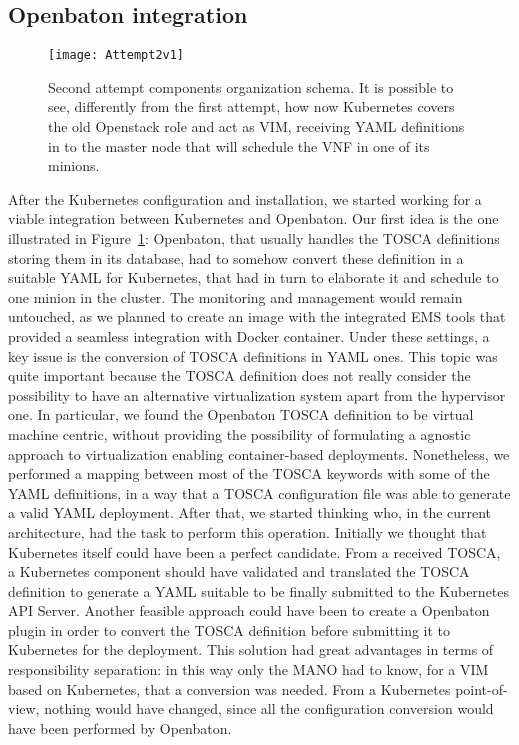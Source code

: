 \subsection{Openbaton integration}

\begin{figure}[t]
  \centering
  \texttt{[image: Attempt2v1]}
  \caption[Second attempt components organization schema]{Second attempt
    components organization schema. It is possible to see, differently from the
    first attempt, how now Kubernetes covers the old Openstack role and act as
    VIM, receiving YAML definitions in to the master node that will schedule the
    VNF in one of its minions.}
  \label{chap:archimpl:sec:secondattempt:img:schema1}
\end{figure}

After the Kubernetes configuration and installation, we started working for a
viable integration between Kubernetes and Openbaton. Our first idea is the one
illustrated in Figure~\ref{chap:archimpl:sec:secondattempt:img:schema1}:
Openbaton, that usually handles the TOSCA definitions storing them in its
database, had to somehow convert these definition in a suitable YAML for
Kubernetes, that had in turn to elaborate it and schedule to one minion in the
cluster. The monitoring and management would remain untouched, as we planned to
create an image with the integrated EMS tools that provided a seamless
integration with Docker container. Under these settings, a key issue is the
conversion of TOSCA definitions in YAML ones. This topic was quite important
because the TOSCA definition does not really consider the possibility to have an
alternative virtualization system apart from the hypervisor one. In particular,
we found the Openbaton TOSCA definition to be virtual machine centric, without
providing the possibility of formulating a agnostic approach to virtualization
enabling container-based deployments. Nonetheless, we performed a mapping
between most of the TOSCA keywords with some of the YAML definitions, in a way
that a TOSCA configuration file was able to generate a valid YAML deployment.
After that, we started thinking who, in the current architecture, had the task
to perform this operation. Initially we thought that Kubernetes itself could
have been a perfect candidate. From a received TOSCA, a Kubernetes component
should have validated and translated the TOSCA definition to generate a YAML
suitable to be finally submitted to the Kubernetes API Server. Another feasible
approach could have been to create a Openbaton plugin in order to convert the
TOSCA definition before submitting it to Kubernetes for the deployment. This
solution had great advantages in terms of responsibility separation: in this way
only the MANO had to know, for a VIM based on Kubernetes, that a conversion was
needed. From a Kubernetes point-of-view, nothing would have changed, since all
the configuration conversion would have been performed by Openbaton.

